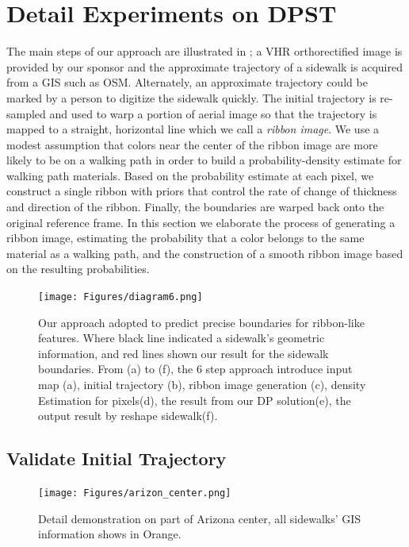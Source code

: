 \chapter{Detail Experiments on \ac{DPST}}

The main steps of our approach are illustrated in ; a \ac{VHR} orthorectified image is provided by our sponsor and the approximate trajectory of a sidewalk is acquired from a \ac{GIS} such as \ac{OSM}.
Alternately, an approximate trajectory could be marked by a person to digitize the sidewalk quickly. 
The initial trajectory is re-sampled and used to warp a portion of aerial image so that the trajectory is mapped to a straight, horizontal line which we call a \textit{ribbon image}. 
We use a modest assumption that colors near the center of the ribbon image are more likely to be on a walking path in order to build a probability-density estimate for walking path materials. 
Based on the probability estimate at each pixel, we construct a single ribbon with priors that control the rate of change of thickness and direction of the ribbon. 
Finally, the boundaries are warped back onto the original reference frame. 
In this section we elaborate the process of generating a ribbon image, estimating the probability that a color belongs to the same material as a walking path, and the construction of a smooth ribbon image based on the resulting probabilities. 

\begin{figure}[H]
\begin{center}
\texttt{[image: Figures/diagram6.png]}
\caption[Framework Overview]{Our approach adopted to predict precise boundaries for ribbon-like features. Where black line indicated a sidewalk's geometric information, and red lines shown our result for the sidewalk boundaries. From (a) to (f), the 6 step approach introduce input map (a), initial trajectory (b), ribbon image generation (c), density Estimation for pixels(d), the result from our \ac{DP} solution(e), the output result by reshape sidewalk(f).}
\label{fig:Apparatus}
\end{center}
\end{figure}

\section{Validate Initial Trajectory}

\begin{figure}[H]
    \centering
    \texttt{[image: Figures/arizon\_center.png]}
    \caption[Demonstration on Arizona Center]{Detail demonstration on part of Arizona center, all sidewalks' \ac{GIS} information shows in Orange.}
    \label{fig:arizon_center}
\end{figure}

